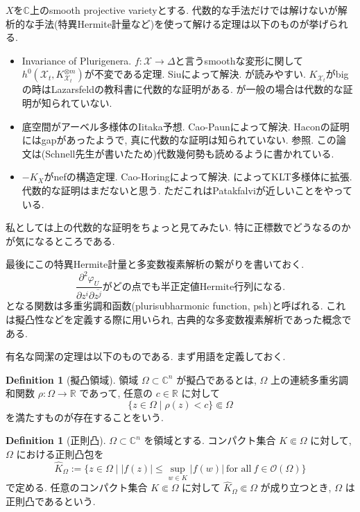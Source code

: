 \documentclass[dvipdfmx,a4paper,11pt]{article} %
\theoremstyle{definition}
\newtheorem{defn}[thm]{Definition}
\theoremstyle{remark}
\numberwithin{equation}{section}
\newcommand{\C}{\mathbb{C}}
\begin{document}
$X$を$\C$上のsmooth projective varietyとする.
代数的な手法だけでは解けないが解析的な手法(特異Hermite計量など)を使って解ける定理は以下のものが挙げられる.
\begin{itemize}
\item Invariance of Plurigenera. $f : \mathcal{X} \to \Delta$と言うsmoothな変形に関して$h^0(\mathcal{X}_t, K_{\mathcal{X}_t}^{\otimes m})$が不変である定理. Siuによって解決. \cite{Paun07}が読みやすい. $K_{\mathcal{X}_t}$がbigの時はLazarsfeldの教科書\cite{Laz04}に代数的な証明がある. が一般の場合は代数的な証明が知られていない. 
\item 底空間がアーベル多様体のIitaka予想. Cao-Paun\cite{CP17}によって解決. Haconの証明にはgapがあったようで, 真に代数的な証明は知られていない. \cite{HPS18}参照. この論文は(Schnell先生が書いたため)代数幾何勢も読めるように書かれている. 
\item $-K_X$がnefの構造定理. Cao-Horing\cite{CH19}によって解決. \cite{MW21}によってKLT多様体に拡張. 代数的な証明はまだないと思う. ただこれはPatakfalviが近しいことをやっている. 
\end{itemize}
私としては上の代数的な証明をちょっと見てみたい. 特に正標数でどうなるのかが気になるところである. 

最後にこの特異Hermite計量と多変数複素解析の繋がりを書いておく. 
$$
\frac{\partial^2 \varphi_U }{\partial z^i \partial \overline{z^j}} \text{がどの点でも半正定値Hermite行列になる.}
$$
となる関数は多重劣調和函数(plurisubharmonic function, psh)と呼ばれる.
これは擬凸性などを定義する際に用いられ, 古典的な多変数複素解析であった概念である. 

有名な岡潔の定理は以下のものである. まず用語を定義しておく.

\begin{defn}[擬凸領域]
領域 \(\Omega\subset \mathbb{C}^n\) が擬凸であるとは, \(\Omega\) 上の連続多重劣調和関数
\(
\rho\colon \Omega\longrightarrow \mathbb{R}
\)
であって, 任意の \(c\in \mathbb{R}\) に対して
\[
\{z\in \Omega\mid \rho(z)<c\}\Subset \Omega
\]
を満たすものが存在することをいう. 
\end{defn}

\begin{defn}[正則凸]
\(\Omega\subset \mathbb{C}^n\) を領域とする. コンパクト集合 \(K\Subset \Omega\) に対して, \(\Omega\) における正則凸包を
\[
\widehat{K}_{\Omega}
:=
\{z\in \Omega\mid |f(z)|\leq \sup_{w\in K}|f(w)|\ \text{for all}\ f\in \mathcal{O}(\Omega)\}
\]
で定める. 任意のコンパクト集合 \(K\Subset \Omega\) に対して
\(
\widehat{K}_{\Omega}\Subset \Omega
\)
が成り立つとき, \(\Omega\) は正則凸であるという.
\end{defn}
\end{document}
